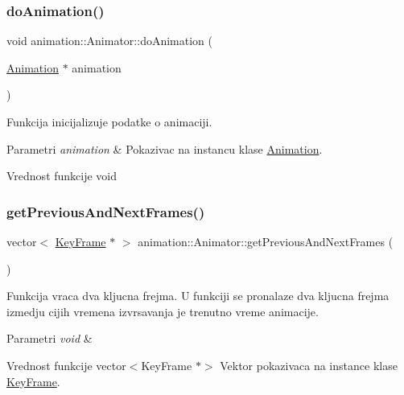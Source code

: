 \subsubsection{\texorpdfstring{do\+Animation()}{doAnimation()}}
{\footnotesize\ttfamily void animation\+::\+Animator\+::do\+Animation (\begin{DoxyParamCaption}\item[{\hyperlink{classanimation_1_1Animation}{Animation} $\ast$}]{animation }\end{DoxyParamCaption})}



Funkcija inicijalizuje podatke o animaciji. 


\begin{DoxyParams}{Parametri}
{\em animation} & Pokazivac na instancu klase \hyperlink{classanimation_1_1Animation}{Animation}. \\
\hline
\end{DoxyParams}
\begin{DoxyReturn}{Vrednost funkcije}
void 
\end{DoxyReturn}
\mbox{\label{classanimation_1_1Animator_af91ac2386b9606f8fa50d65f33fa0be0}} 
\subsubsection{\texorpdfstring{get\+Previous\+And\+Next\+Frames()}{getPreviousAndNextFrames()}}
{\footnotesize\ttfamily vector$<$ \hyperlink{classanimation_1_1KeyFrame}{Key\+Frame} $\ast$ $>$ animation\+::\+Animator\+::get\+Previous\+And\+Next\+Frames (\begin{DoxyParamCaption}{ }\end{DoxyParamCaption})\hspace{0.3cm}{\ttfamily [private]}}



Funkcija vraca dva kljucna frejma. U funkciji se pronalaze dva kljucna frejma izmedju cijih vremena izvrsavanja je trenutno vreme animacije. 


\begin{DoxyParams}{Parametri}
{\em void} & \\
\hline
\end{DoxyParams}
\begin{DoxyReturn}{Vrednost funkcije}
vector$<$\+Key\+Frame $\ast$$>$ Vektor pokazivaca na instance klase \hyperlink{classanimation_1_1KeyFrame}{Key\+Frame}. 
\end{DoxyReturn}
\mbox{\label{classanimation_1_1Animator_a688e72bb61014ad3431a8bbfd9e75c99}} 
